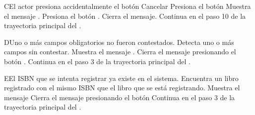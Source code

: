 
\begin{UCtrayectoriaA}{C}{El actor presiona accidentalmente el botón Cancelar}
	\UCpaso[\UCactor] Presiona el botón 
    \UCpaso Muestra el mensaje .
    \UCpaso[\UCactor] Presiona el botón .
    \UCpaso Cierra el mensaje.
    \UCpaso Continua en el paso 10 de la trayectoria principal del .
\end{UCtrayectoriaA}


\begin{UCtrayectoriaA}{D}{Uno o más campos obligatorios no fueron contestados.}
	\UCpaso Detecta uno o más campos sin contestar.
    \UCpaso Muestra el mensaje .
    \UCpaso[\UCactor] Cierra el mensaje presionando el botón .
    \UCpaso Continua en el paso 3 de la trayectoria principal del .
\end{UCtrayectoriaA}


\begin{UCtrayectoriaA}{E}{El ISBN que se intenta registrar ya existe en el sistema.}
	\UCpaso Encuentra un libro registrado con el mismo ISBN que el libro que se está registrando.
    \UCpaso Muestra el mensaje 
    \UCpaso[\UCactor] Cierra el mensaje presionando el botón 
    \UCpaso Continua en el paso 3 de la trayectoria principal del .
\end{UCtrayectoriaA}